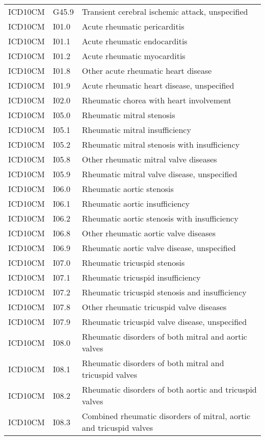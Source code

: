 \begin{longtable}{p{}p{}p{}}
  ICD10CM & G45.9 & Transient cerebral ischemic attack, unspecified \\ 
  ICD10CM & I01.0 & Acute rheumatic pericarditis \\ 
  ICD10CM & I01.1 & Acute rheumatic endocarditis \\ 
  ICD10CM & I01.2 & Acute rheumatic myocarditis \\ 
  ICD10CM & I01.8 & Other acute rheumatic heart disease \\ 
  ICD10CM & I01.9 & Acute rheumatic heart disease, unspecified \\ 
  ICD10CM & I02.0 & Rheumatic chorea with heart involvement \\ 
  ICD10CM & I05.0 & Rheumatic mitral stenosis \\ 
  ICD10CM & I05.1 & Rheumatic mitral insufficiency \\ 
  ICD10CM & I05.2 & Rheumatic mitral stenosis with insufficiency \\ 
  ICD10CM & I05.8 & Other rheumatic mitral valve diseases \\ 
  ICD10CM & I05.9 & Rheumatic mitral valve disease, unspecified \\ 
  ICD10CM & I06.0 & Rheumatic aortic stenosis \\ 
  ICD10CM & I06.1 & Rheumatic aortic insufficiency \\ 
  ICD10CM & I06.2 & Rheumatic aortic stenosis with insufficiency \\ 
  ICD10CM & I06.8 & Other rheumatic aortic valve diseases \\ 
  ICD10CM & I06.9 & Rheumatic aortic valve disease, unspecified \\ 
  ICD10CM & I07.0 & Rheumatic tricuspid stenosis \\ 
  ICD10CM & I07.1 & Rheumatic tricuspid insufficiency \\ 
  ICD10CM & I07.2 & Rheumatic tricuspid stenosis and insufficiency \\ 
  ICD10CM & I07.8 & Other rheumatic tricuspid valve diseases \\ 
  ICD10CM & I07.9 & Rheumatic tricuspid valve disease, unspecified \\ 
  ICD10CM & I08.0 & Rheumatic disorders of both mitral and aortic valves \\ 
  ICD10CM & I08.1 & Rheumatic disorders of both mitral and tricuspid valves \\ 
  ICD10CM & I08.2 & Rheumatic disorders of both aortic and tricuspid valves \\ 
  ICD10CM & I08.3 & Combined rheumatic disorders of mitral, aortic and tricuspid valves \\ 

\end{longtable}
